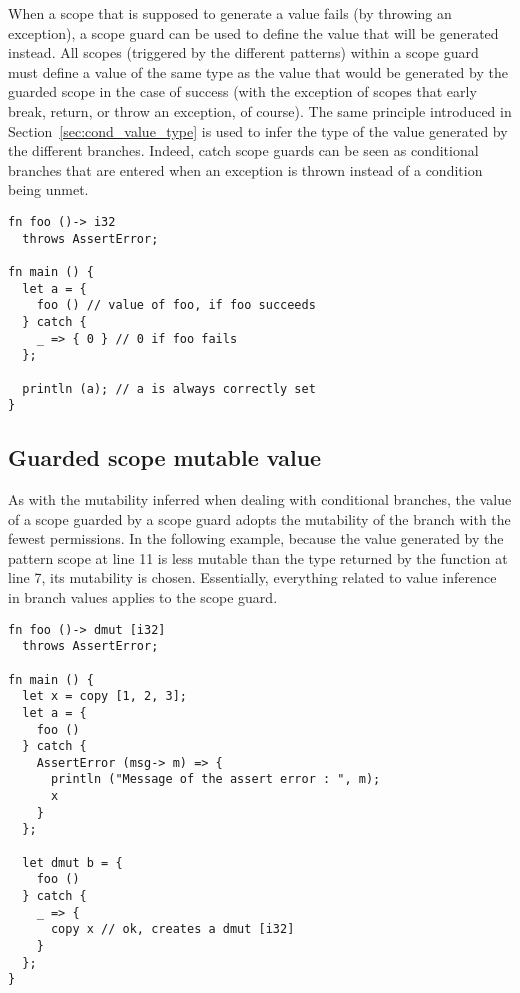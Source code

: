 When a scope that is supposed to generate a value fails (by throwing an
exception), a  scope guard can be used to define the value that
will be generated instead. All scopes (triggered by the different patterns)
within a  scope guard must define a value of the same type as the
value that would be generated by the guarded scope in the case of success (with
the exception of scopes that early break, return, or throw an exception, of
course). The same principle introduced in Section~\ref{sec:cond_value_type} is
used to infer the type of the value generated by the different branches. Indeed,
catch scope guards can be seen as  conditional branches that are
entered when an exception is thrown instead of a condition being unmet.

\begin{lstlisting}[style=coloredverbatim]
fn foo ()-> i32
  throws AssertError;

fn main () {
  let a = {
    foo () // value of foo, if foo succeeds
  } catch {
    _ => { 0 } // 0 if foo fails
  };

  println (a); // a is always correctly set
}
\end{lstlisting}


\subsection{Guarded scope mutable value}

As with the mutability inferred when dealing with conditional branches, the
value of a scope guarded by a  scope guard adopts the mutability of
the branch with the fewest permissions. In the following example, because the
value generated by the  pattern scope at line 11 is less mutable
than the type returned by the function  at line 7, its mutability is
chosen. Essentially, everything related to value inference in branch values
applies to the  scope guard.

\begin{lstlisting}[style=coloredverbatim]
fn foo ()-> dmut [i32]
  throws AssertError;

fn main () {
  let x = copy [1, 2, 3];
  let a = {
    foo ()
  } catch {
    AssertError (msg-> m) => {
      println ("Message of the assert error : ", m);
      x
    }
  };

  let dmut b = {
    foo ()
  } catch {
    _ => {
      copy x // ok, creates a dmut [i32]
    }
  };
}
\end{lstlisting}

